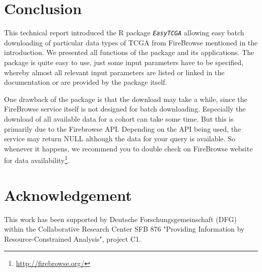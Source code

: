 \documentclass{TechReport}
\begin{document}
\section{Conclusion}
This technical report introduced the R package \texttt{\em EasyTCGA} allowing
easy batch downloading of particular data types of TCGA from
FireBrowse mentioned in the introduction.  We presented all functions
of the package and its applications. The package is quite easy to use,
just some input parameters have to be specified, whereby almost all
relevant input parameters are
listed or linked in the documentation or are provided by the package itself.

One drawback of the package is that the download may take a while,
since the FireBrowse service itself is not designed for batch
downloading. Especially the download of all available data for a
cohort can take some time. But this is primarily due to the Firebrowse
API. Depending on the API being used, the service may return NULL
although the data for your query is available. So whenever it happens, 
we recommend you to double check on FireBrowse website
for data availability\footnote{\url{http://firebrowse.org/}}.





\newpage
\section*{Acknowledgement}

This work has been supported by Deutsche Forschungsgemeinschaft
   (DFG) within the Collaborative Research Center SFB 876 "Providing
   Information by Resource-Constrained Analysis", project C1.
\end{document}
